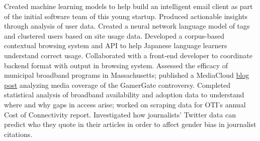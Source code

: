 \documentclass[11pt]{letter}
\begin{document}
{
\newline
{}
\newline Created machine learning models to help build an intelligent email client as part of the initial software team of this young startup.  
\newline
{}
\newline Produced actionable insights through analysis of user data.  Created a neural network language model of tags and clustered users based on site usage data.  
\newline
{}
\newline Developed a corpus-based contextual browsing system and API to help Japanese language learners understand correct usage.  Collaborated with a front-end developer to coordinate backend format with output in browsing system.
\newline
{}
\newline 
Assessed the efficacy of municipal broadband programs in Massachusetts; published a MediaCloud \href{http://mediacloud.org/2015/11/04/the-meaning-of-common-links-in-media-conflict-bridges-or-hate-links/}{\color{blue} blog post} analyzing media coverage of the GamerGate controversy.
\newline
{}
\newline
Completed statistical analysis of broadband availability and adoption data to understand where and why gaps in access arise; worked on scraping data for OTI's annual Cost of Connectivity report.  
\newline
{}
\newline Investigated how journalists' Twitter data can predict who they quote in their articles in order to affect gender bias in journalist citations.

}
\end{document}
